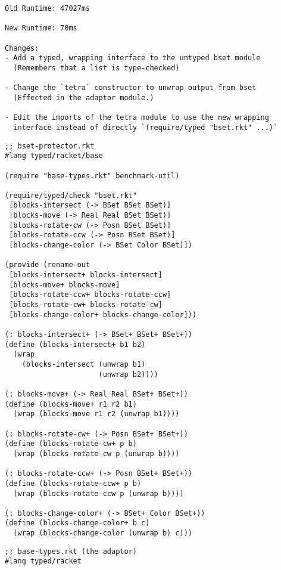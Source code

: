 \documentclass{article}
\begin{document}
\begin{verbatim}
Old Runtime: 47027ms

New Runtime: 70ms

Changes:
- Add a typed, wrapping interface to the untyped bset module
  (Remembers that a list is type-checked)

- Change the `tetra` constructor to unwrap output from bset
  (Effected in the adaptor module.)

- Edit the imports of the tetra module to use the new wrapping
  interface instead of directly `(require/typed "bset.rkt" ...)`
\end{verbatim}

\newpage
{
\begin{minipage}{0.4\textwidth}
\begin{verbatim}
;; bset-protector.rkt
#lang typed/racket/base

(require "base-types.rkt" benchmark-util)

(require/typed/check "bset.rkt"
 [blocks-intersect (-> BSet BSet BSet)]
 [blocks-move (-> Real Real BSet BSet)]
 [blocks-rotate-cw (-> Posn BSet BSet)]
 [blocks-rotate-ccw (-> Posn BSet BSet)]
 [blocks-change-color (-> BSet Color BSet)])

(provide (rename-out
 [blocks-intersect+ blocks-intersect]
 [blocks-move+ blocks-move]
 [blocks-rotate-ccw+ blocks-rotate-ccw]
 [blocks-rotate-cw+ blocks-rotate-cw]
 [blocks-change-color+ blocks-change-color]))

(: blocks-intersect+ (-> BSet+ BSet+ BSet+))
(define (blocks-intersect+ b1 b2)
  (wrap
    (blocks-intersect (unwrap b1)
                      (unwrap b2))))

(: blocks-move+ (-> Real Real BSet+ BSet+))
(define (blocks-move+ r1 r2 b1)
  (wrap (blocks-move r1 r2 (unwrap b1))))

(: blocks-rotate-cw+ (-> Posn BSet+ BSet+))
(define (blocks-rotate-cw+ p b)
  (wrap (blocks-rotate-cw p (unwrap b))))

(: blocks-rotate-ccw+ (-> Posn BSet+ BSet+))
(define (blocks-rotate-ccw+ p b)
  (wrap (blocks-rotate-ccw p (unwrap b))))

(: blocks-change-color+ (-> BSet+ Color BSet+))
(define (blocks-change-color+ b c)
  (wrap (blocks-change-color (unwrap b) c)))
\end{verbatim}
\end{minipage}
\hfill
\begin{minipage}{0.4\textwidth}
\begin{verbatim}
;; base-types.rkt (the adaptor)
#lang typed/racket


\end{verbatim}
\end{minipage}}
\end{document}
